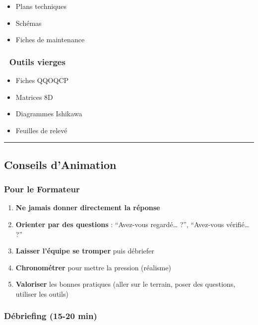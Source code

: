 \documentclass[
]{article}
\providecommand{\tightlist}{%
  \setlength{\itemsep}{0pt}\setlength{\parskip}{0pt}}
\begin{document}
\begin{itemize}
\tightlist
\item
  Plans techniques
\item
  Schémas
\item
  Fiches de maintenance
\end{itemize}

\subsubsection{📝 Outils vierges}\label{outils-vierges}

\begin{itemize}
\tightlist
\item
  Fiches QQOQCP
\item
  Matrices 8D
\item
  Diagrammes Ishikawa
\item
  Feuilles de relevé
\end{itemize}

\begin{center}\rule{0.5\linewidth}{0.5pt}\end{center}

\subsection{Conseils d'Animation}\label{conseils-danimation}

\subsubsection{Pour le Formateur}\label{pour-le-formateur}

\begin{enumerate}
\def\labelenumi{\arabic{enumi}.}
\tightlist
\item
  \textbf{Ne jamais donner directement la réponse}
\item
  \textbf{Orienter par des questions} : ``Avez-vous regardé\ldots{} ?'',
  ``Avez-vous vérifié\ldots{} ?''
\item
  \textbf{Laisser l'équipe se tromper} puis débriefer
\item
  \textbf{Chronométrer} pour mettre la pression (réalisme)
\item
  \textbf{Valoriser} les bonnes pratiques (aller sur le terrain, poser
  des questions, utiliser les outils)
\end{enumerate}

\subsubsection{Débriefing (15-20 min)}\label{duxe9briefing-15-20-min}
\end{document}
